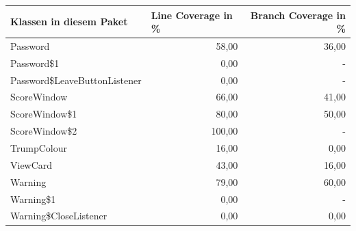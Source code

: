 \documentclass[a4paper]{article}
\begin{document}
\noindent
\begin{tabular}{|l|r|r|}
\hline
Klassen in diesem Paket & \multicolumn{1}{l|}{Line Coverage in \%} & Branch Coverage in \% \\ \hline \hline

Password & 58,00 & \multicolumn{1}{r|}{36,00} \\ \hline
Password\$1 & 0,00 & - \\ \hline
Password\$LeaveButtonListener & 0,00 & - \\ \hline
ScoreWindow & 66,00 & \multicolumn{1}{r|}{41,00} \\ \hline
ScoreWindow\$1 & 80,00 & \multicolumn{1}{r|}{50,00} \\ \hline
ScoreWindow\$2 & 100,00 & - \\ \hline
TrumpColour & 16,00 & \multicolumn{1}{r|}{0,00} \\ \hline
ViewCard & 43,00 & \multicolumn{1}{r|}{16,00} \\ \hline
Warning & 79,00 & \multicolumn{1}{r|}{60,00} \\ \hline
Warning\$1 & 0,00 & - \\ \hline
Warning\$CloseListener & 0,00 & \multicolumn{1}{r|}{0,00} \\ \hline
\end{tabular}

	
\end{document}
